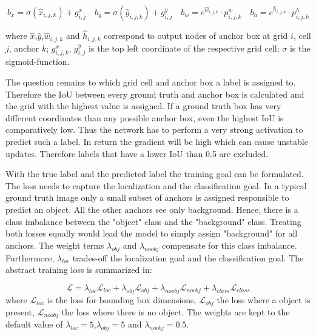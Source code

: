 \begin{equation}
\label{sec:encoding}
b_x = \sigma(\hat x_{i,j,k}) + g^x_{i,j}\quad
b_y = \sigma(\hat y_{i,j,k}) + g^y_{i,j}\quad
b_w = e^{\hat w_{i,j,k}} \cdot p^w_{i,j,k}\quad
b_h = e^{\hat h_{i,j,k}} \cdot p^h_{i,j,k}
\end{equation}

where $\hat{x}$,$\hat{y}$,$\hat w_{i,j,k}$ and $\hat h_{i,j,k}$ correspond to output nodes of anchor box at grid $i$, cell $j$, anchor $k$; $g^x_{i,j,k}$, $g^y_{i,j}$ is the top left coordinate of the respective grid cell; $\sigma$ is the sigmoid-function.

The question remains to which grid cell and anchor box a label is assigned to. Therefore the \ac{IoU} between every ground truth and anchor box is calculated and the grid with the highest value is assigned. If a ground truth box has very different coordinates than any possible anchor box, even the highest \ac{IoU} is comparatively low. Thus the network has to perform a very strong activation to predict such a label. In return the gradient will be high which can cause unstable updates. Therefore labels that have a lower \ac{IoU} than 0.5 are excluded. 

With the true label and the predicted label the training goal can be formulated. The loss needs to capture the localization and the classification goal. In a typical ground truth image only a small subset of anchors is assigned responsible to predict an object. All the other anchors see only background. Hence, there is a class imbalance between the "object" class and the "background" class. Treating both losses equally would lead the model to simply assign "background" for all anchors. The weight terms $\lambda_{obj}$ and $\lambda_{noobj}$ compensate for this class imbalance. Furthermore, $\lambda_{loc}$ trades-off the localization goal and the classification goal. The abstract training loss is summarized in: 

\begin{equation}
\mathcal{L} = \lambda_{loc}\mathcal{L}_{loc} + \lambda_{obj}\mathcal{L}_{obj} + \lambda_{noobj}\mathcal{L}_{noobj} + \lambda_{class}\mathcal{L}_{class}
\end{equation}
where $\mathcal{L}_{loc}$ is the loss for bounding box dimensions, $\mathcal{L}_{obj}$ the loss where a object is present, $\mathcal{L}_{noobj}$ the loss where there is no object. The weights are kept to the default value of $\lambda_{loc} = 5$,$\lambda_{obj} = 5$ and $\lambda_{noobj} = 0.5$.

